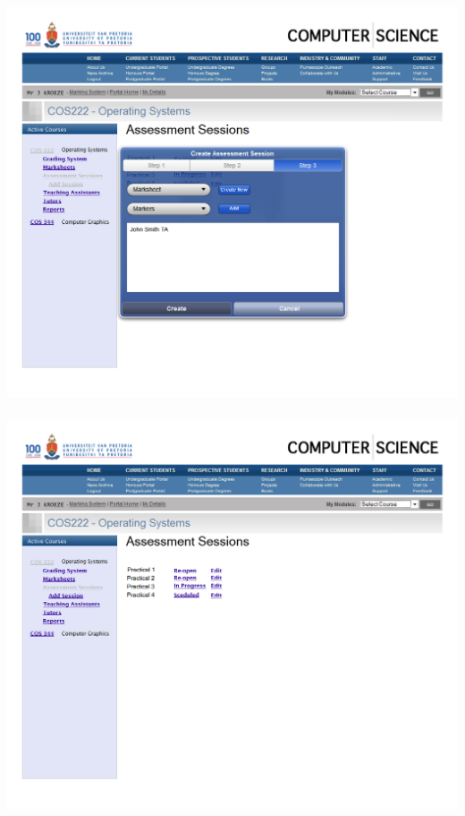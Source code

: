 \documentclass[12pt,a4paper]{article}
\begin{document}
\includegraphics[scale=0.3]{./WebUI/3.png}\\\\
\includegraphics[scale=0.3]{./WebUI/4.png}\\\\
\end{document}
